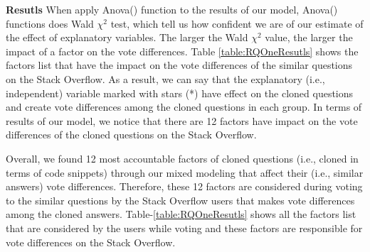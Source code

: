 \documentclass[conference]{IEEEtran}
\begin{document}
\textbf{Resutls}  When apply Anova() function to the results of our model, Anova() functions does Wald $\chi^2$ test, which tell us how confident we are of our estimate of the effect of explanatory variables. The larger the Wald $\chi^2$ value, the larger the impact of a factor on the vote differences. Table \ref{table:RQOneResutls} shows the factors list that have the impact on the vote differences of the similar questions on the Stack Overflow. As a result, we can say that the explanatory (i.e., independent) variable marked with stars (*) have effect on the cloned questions and create vote differences among the cloned questions in each group. In terms of results of our model, we notice that there are 12 factors have impact on the vote differences of the cloned questions on the Stack Overflow.

Overall, we found 12 most accountable factors of cloned questions (i.e., cloned in terms of code snippets) through our mixed modeling that affect their (i.e., similar answers) vote differences. Therefore, these 12 factors are considered during voting to the similar questions by the Stack Overflow users that makes vote differences among the cloned answers. Table-\ref{table:RQOneResutls} shows  all the factors list that are considered by the users while voting and these factors are responsible for vote differences on the Stack Overflow.
 \newline
\end{document}
